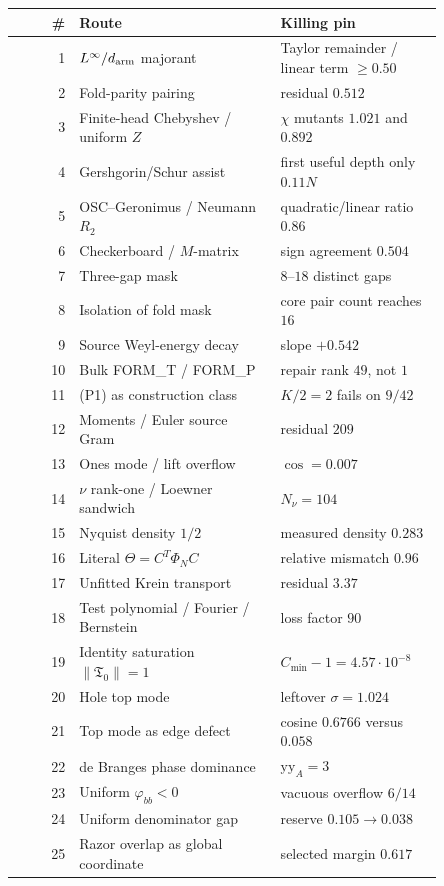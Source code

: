 \documentclass[11pt]{article}
\begin{document}
\scriptsize
\begin{longtable}{@{}r p{0.47\linewidth} p{0.38\linewidth}@{}}
\toprule
\# & Route & Killing pin\\
\midrule
\endhead
1 & $L^\infty/d_{\rm arm}$ majorant & Taylor remainder / linear term $\ge0.50$\\
2 & Fold-parity pairing & residual $0.512$\\
3 & Finite-head Chebyshev / uniform $Z$ & $\chi$ mutants $1.021$ and $0.892$\\
4 & Gershgorin/Schur assist & first useful depth only $0.11N$\\
5 & OSC--Geronimus / Neumann $R_2$ & quadratic/linear ratio $0.86$\\
6 & Checkerboard / $M$-matrix & sign agreement $0.504$\\
7 & Three-gap mask & $8$--$18$ distinct gaps\\
8 & Isolation of fold mask & core pair count reaches $16$\\
9 & Source Weyl-energy decay & slope $+0.542$\\
10 & Bulk FORM\_T / FORM\_P & repair rank $49$, not $1$\\
11 & (P1) as construction class & $K/2=2$ fails on $9/42$\\
12 & Moments / Euler source Gram & residual $209$\\
13 & Ones mode / lift overflow & $\cos=0.007$\\
14 & $\nu$ rank-one / Loewner sandwich & $N_\nu=104$\\
15 & Nyquist density $1/2$ & measured density $0.283$\\
16 & Literal $\Theta=C^T\Phi_NC$ & relative mismatch $0.96$\\
17 & Unfitted Krein transport & residual $3.37$\\
18 & Test polynomial / Fourier / Bernstein & loss factor $90$\\
19 & Identity saturation $\|\mathfrak T_0\|=1$ & $C_{\min}-1=4.57\cdot10^{-8}$\\
20 & Hole top mode & leftover $\sigma=1.024$\\
21 & Top mode as edge defect & cosine $0.6766$ versus $0.058$\\
22 & de Branges phase dominance & $\mathrm{yy}_A=3$\\
23 & Uniform $\varphi_{bb}<0$ & vacuous overflow $6/14$\\
24 & Uniform denominator gap & reserve $0.105\to0.038$\\
25 & Razor overlap as global coordinate & selected margin $0.617$\\

\end{longtable}
\end{document}
